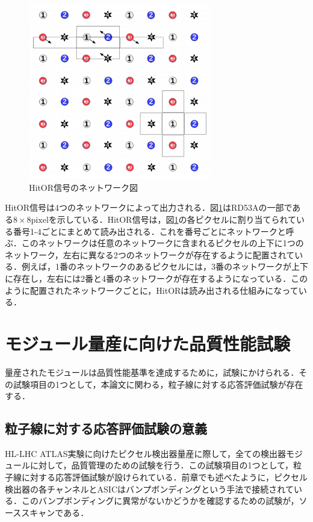 \begin{figure}[h]
  \centering
  \includegraphics[width=8cm]{./figure/HitOR.png}
  \caption{HitOR信号のネットワーク図\cite{Garcia-Sciveres:2287593}}
  \label{fig:HitOR}
\end{figure}

HitOR信号は4つのネットワークによって出力される．図\ref{fig:HitOR}はRD53Aの一部である$8 \times 8 \mathrm{pixel}$を示している．HitOR信号は，図\ref{fig:HitOR}の各ピクセルに割り当てられている番号1-4ごとにまとめて読み出される．これを番号ごとにネットワークと呼ぶ．このネットワークは任意のネットワークに含まれるピクセルの上下に1つのネットワーク，左右に異なる2つのネットワークが存在するように配置されている．例えば，1番のネットワークのあるピクセルには，3番のネットワークが上下に存在し，左右には2番と4番のネットワークが存在するようになっている．このように配置されたネットワークごとに，HitORは読み出される仕組みになっている．

\section{モジュール量産に向けた品質性能試験}
\label{sec:moduletest}
量産されたモジュールは品質性能基準を達成するために，試験にかけられる．その試験項目の1つとして，本論文に関わる，粒子線に対する応答評価試験が存在する．

\subsection{粒子線に対する応答評価試験の意義}
HL-LHC ATLAS実験に向けたピクセル検出器量産に際して，全ての検出器モジュールに対して，品質管理のための試験を行う．この試験項目の1つとして，粒子線に対する応答評価試験が設けられている．前章でも述べたように，ピクセル検出器の各チャンネルとASICはバンプボンディングという手法で接続されている．このバンプボンディングに異常がないかどうかを確認するための試験が，ソーススキャンである．\par

